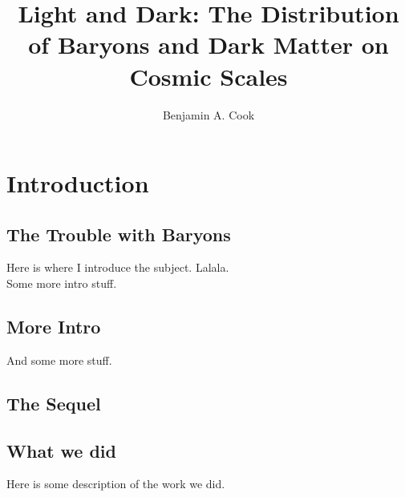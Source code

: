 \documentclass{puthesis_undergraduate}
\title{Light and Dark: The Distribution of Baryons and Dark Matter on \\
  Cosmic Scales}
\author{Benjamin A. Cook}
\begin{document}
\chapter*{Introduction}
\label{c.Intro}
\section{The Trouble with Baryons}
\label{s.Trouble}
Here is where I introduce the subject. Lalala.\\

Some more intro stuff.\\

\section{More Intro}
\label{s.More}
And some more stuff.\\

\section{The Sequel}
\label{c.Sequel}
\section{What we did}
\label{s.Work}
Here is some description of the work we did.\\

\citep{Ade2013b}


\end{document}
